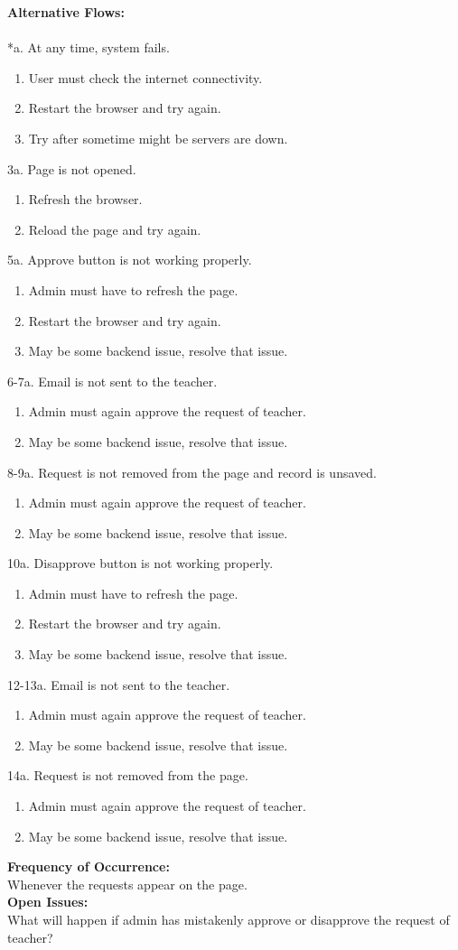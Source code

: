 \textbf{Alternative Flows:}\\
\\
*a. At any time, system fails.
\begin{enumerate}
\item User must check the internet connectivity.
\item Restart the browser and try again.
\item Try after sometime might be servers are down.
\end{enumerate}
3a. Page is not opened.
\begin{enumerate}
\item Refresh the browser.
\item Reload the page and try again.
\end{enumerate}
5a. Approve button is not working properly.
\begin{enumerate}
\item Admin must have to refresh the page.
\item Restart the browser and try again.
\item May be some backend issue, resolve that issue.
\end{enumerate}
6-7a. Email is not sent to the teacher.
\begin{enumerate}
\item Admin must again approve the request of teacher.
\item May be some backend issue, resolve that issue.
\end{enumerate}
8-9a. Request is not removed from the page and record is unsaved.
\begin{enumerate}
\item Admin must again approve the request of teacher.
\item May be some backend issue, resolve that issue.
\end{enumerate}
10a. Disapprove button is not working properly.
\begin{enumerate}
\item Admin must have to refresh the page.
\item Restart the browser and try again.
\item May be some backend issue, resolve that issue.
\end{enumerate}
12-13a. Email is not sent to the teacher.
\begin{enumerate}
\item Admin must again approve the request of teacher.
\item May be some backend issue, resolve that issue.
\end{enumerate}
14a. Request is not removed from the page.
\begin{enumerate}
\item Admin must again approve the request of teacher.
\item May be some backend issue, resolve that issue.
\end{enumerate}
\textbf{Frequency of Occurrence:}\\
Whenever the requests appear on the page.
\\
\textbf{Open Issues:}\\
What will happen if admin has mistakenly approve or disapprove the request of teacher?


